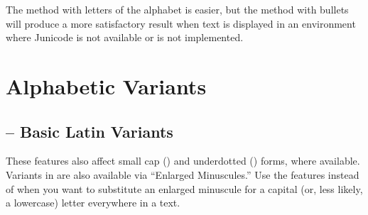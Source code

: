 \noindent The method with letters of the alphabet is easier, but the method with bullets will produce a more satisfactory result
when text is displayed in an environment where Junicode is not available or  is not
implemented.

\section{Alphabetic Variants}
\subsection{ -- Basic Latin Variants}
These features also affect small cap () and underdotted () forms,
where available. Variants in  are also available via  “Enlarged Minuscules.”
Use the  features instead of  when you want to substitute an
enlarged minuscule for a capital (or, less likely, a lowercase) letter everywhere in a text.

